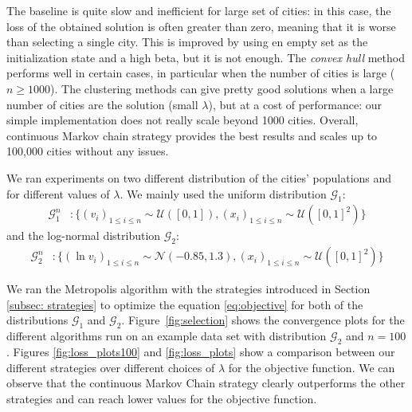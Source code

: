 \documentclass[conference,compsoc]{IEEEtran}
\begin{document}
The baseline is quite slow and inefficient for large set of cities: in this
case, the loss of the obtained solution is often greater than zero, meaning that
it is worse than selecting a single city. This is improved by using en empty set
as the initialization state and a high beta, but it is not enough. The
\textit{convex hull} method performs well in certain cases, in particular when
the number of cities is large ($ n \geq 1000$). The clustering methods can give
pretty good solutions when a large number of cities are the solution (small
$\lambda$), but at a cost of performance: our simple implementation does not
really scale beyond 1000 cities. Overall, continuous Markov chain strategy
provides the best results and scales up to 100,000 cities without any issues.

We ran experiments on two different distribution of the cities' populations and
for different values of $\lambda$. We mainly used the uniform distribution
$\mathcal{G}_1$:
\begin{align*}
    \mathcal{G}_1^n &: \lbrace (v_i)_{1\leq i \leq n} \sim \mathcal{U}([0, 1]),  (x_i)_{1\leq i \leq n} \sim \mathcal{U}([0, 1]^2) \rbrace
\end{align*}
and the log-normal distribution $\mathcal{G}_2$:
\begin{align*}
    \mathcal{G}_2^n &: \lbrace (\ln v_i)_{1\leq i \leq n} \sim \mathcal{N}(-0.85, 1.3),  (x_i)_{1\leq i \leq n} \sim \mathcal{U}([0, 1]^2)\rbrace
\end{align*}

We ran the Metropolis algorithm with the strategies introduced in Section
\ref{subsec: strategies} to optimize the equation \eqref{eq:objective} for both
of the distributions $\mathcal{G}_1$ and $\mathcal{G}_2$.
Figure~\ref{fig:selection} shows the convergence plots for the different
algorithms run on an example data set with distribution $\mathcal{G}_2$ and $n =
100$. Figures \ref{fig:loss_plots100} and \ref{fig:loss_plots} show a comparison between our different strategies over different choices of $\lambda$ for the objective function. We can observe that
the continuous Markov Chain strategy clearly outperforms the other strategies
and can reach lower values for the objective function.
\end{document}
